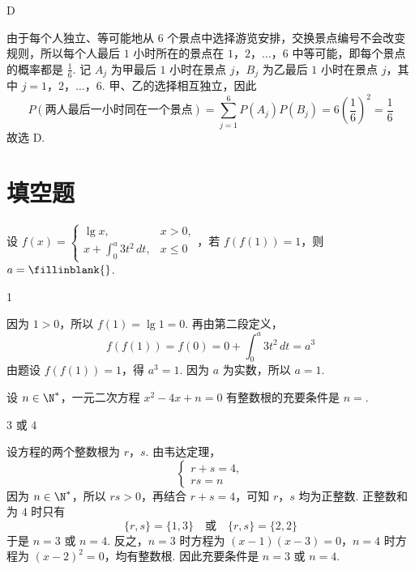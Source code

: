 \begin{answer}
D
\end{answer}

\begin{solution}
由于每个人独立、等可能地从 \(6\) 个景点中选择游览安排，交换景点编号不会改变规则，所以每个人最后 \(1\) 小时所在的景点在 \(1\)，\(2\)，\(\ldots\)，\(6\) 中等可能，即每个景点的概率都是 \(\frac{1}{6}\). 记 \(A_j\) 为甲最后 \(1\) 小时在景点 \(j\)，\(B_j\) 为乙最后 \(1\) 小时在景点 \(j\)，其中 \(j=1\)，\(2\)，\(\ldots\)，\(6\). 甲、乙的选择相互独立，因此
\[
\displaystyle P(\text{两人最后一小时同在一个景点})=\sum_{j=1}^{6}P(A_j)P(B_j)=6\left(\frac{1}{6}\right)^2=\frac{1}{6}
\]
故选 D.
\end{solution}

\section{填空题}

\begin{problem}
设 \(f(x)=\begin{cases}
\lg x, & x>0,\\
x+\int_{0}^{a} 3t^{2}\,dt, & x\leqslant 0
\end{cases}\)，若 \(f(f(1))=1\)，则 \(a=\fillinblank{}\).
\end{problem}

\begin{answer}
1
\end{answer}

\begin{solution}
因为 \(1>0\)，所以 \(f(1)=\lg 1=0\). 再由第二段定义，
\[
f(f(1))=f(0)=0+\int_{0}^{a}3t^2\,dt=a^3
\]
由题设 \(f(f(1))=1\)，得 \(a^3=1\). 因为 \(a\) 为实数，所以 \(a=1\).
\end{solution}

\begin{problem}
设 \(n \in \N^*\)，一元二次方程 \(x^2 - 4x + n = 0\) 有整数根的充要条件是 \(n = \)\fillinblank{}.
\end{problem}

\begin{answer}
\(3\) 或 \(4\)
\end{answer}

\begin{solution}
设方程的两个整数根为 \(r\)，\(s\). 由韦达定理，
\[
\begin{cases}
r+s=4,\\
rs=n
\end{cases}
\]
因为 \(n\in\N^*\)，所以 \(rs>0\)，再结合 \(r+s=4\)，可知 \(r\)，\(s\) 均为正整数. 正整数和为 \(4\) 时只有
\[
\{r,s\}=\{1,3\}\quad\text{或}\quad \{r,s\}=\{2,2\}
\]
于是 \(n=3\) 或 \(n=4\). 反之，\(n=3\) 时方程为 \((x-1)(x-3)=0\)，\(n=4\) 时方程为 \((x-2)^2=0\)，均有整数根. 因此充要条件是 \(n=3\) 或 \(n=4\).
\end{solution}

